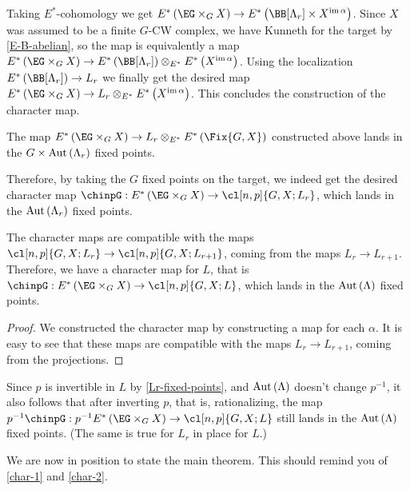 Taking $E^*$-cohomology we get $E^*\left(\EG \times_G X\right) \to E^*\left(\BB[\Lambda_r] \times X^{\im \alpha}\right)$.
Since $X$ was assumed to be a finite $G$-CW complex, we have Kunneth for the target by \ref{E-B-abelian}, so the map is equivalently a map $E^*\left(\EG \times_G X\right) \to E^*\left(\BB[\Lambda_r]\right) \otimes_{E^*} E^*\left(X^{\im \alpha}\right)$.
Using the localization $E^*\left(\BB[\Lambda_r]\right) \to L_r$ we finally get the desired map $E^*\left(\EG \times_G X\right) \to L_r \otimes_{E^*} E^*\left(X^{\im \alpha}\right)$.
This concludes the construction of the character map.

\begin{proposition}
	The map $E^*\left(\EG \times_G X\right) \to L_r \otimes_{E^*} E^*\left(\Fix{G,X}\right)$ constructed above lands in the $G \times \operatorname{Aut} \left(\Lambda_r\right)$ fixed points.
\end{proposition}

Therefore, by taking the $G$ fixed points on the target, we indeed get the desired character map $\chinpG: E^*\left(\EG \times_G X\right) \to \cl[n,p]{G,X; L_r}$, which lands in the $\operatorname{Aut} \left(\Lambda_r\right)$ fixed points.

\begin{proposition}
	The character maps are compatible with the maps $\cl[n,p]{G,X; L_r} \to \cl[n,p]{G,X; L_{r+1}}$, coming from the maps $L_r \to L_{r+1}$.
	Therefore, we have a character map for $L$, that is $\chinpG: E^*\left(\EG \times_G X\right) \to \cl[n,p]{G,X; L}$, which lands in the $\operatorname{Aut} \left(\Lambda\right)$ fixed points.
\end{proposition}

\begin{proof}
	We constructed the character map by constructing a map for each $\alpha$.
	It is easy to see that these maps are compatible with the maps $L_r \to L_{r+1}$, coming from the projections.
\end{proof}

Since $p$ is invertible in $L$ by \ref{Lr-fixed-points}, and $\operatorname{Aut} \left(\Lambda\right)$ doesn't change $p^{-1}$, it also follows that after inverting $p$, that is, rationalizing, the map $p^{-1} \chinpG: p^{-1} E^*\left(\EG \times_G X\right) \to \cl[n,p]{G,X; L}$ still lands in the $\operatorname{Aut} \left(\Lambda\right)$ fixed points.
(The same is true for $L_r$ in place for $L$.)

We are now in position to state the main theorem.
This should remind you of \ref{char-1} and \ref{char-2}.

